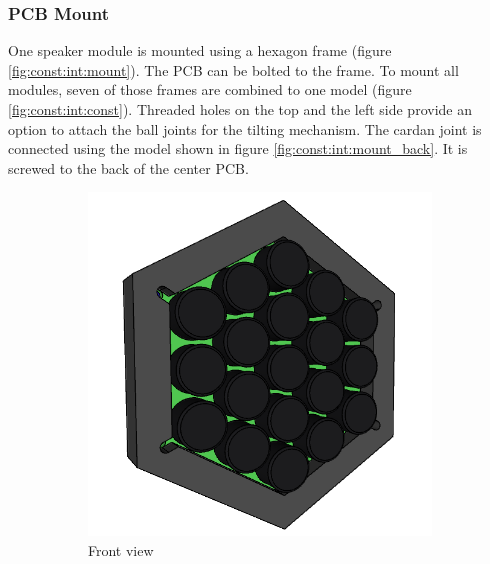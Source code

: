 \subsubsection*{PCB Mount}
%
One speaker module is mounted using a hexagon frame (figure \ref{fig:const:int:mount}). The PCB can be bolted to the frame. To mount all modules, seven of those frames are combined to one model (figure \ref{fig:const:int:const}). Threaded holes on the top and the left side provide an option to attach the ball joints for the tilting mechanism. The cardan joint is connected using the model shown in figure \ref{fig:const:int:mount_back}. It is screwed to the back of the center PCB.
%
\begin{figure}[ht]
  \begin{subfigure}[b]{0.49\textwidth}
    \includegraphics[width=\textwidth]{src/assets/pictures/construction/pcb_plate.png}
    \caption{Front view}
    \label{fig:const:int:mount_front}
  \end{subfigure}
  \hfill
  \begin{subfigure}[b]{0.49\textwidth}

\end{subfigure}
\end{figure}

